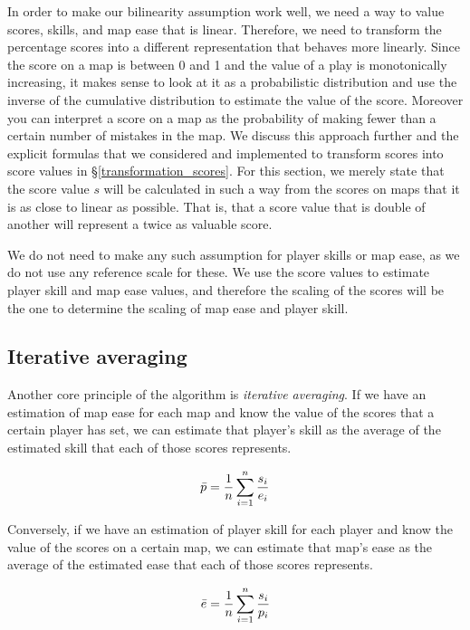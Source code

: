 \documentclass[12pt,a4paper]{article}
\begin{document}
In order to make our bilinearity assumption work well, we need a way to value scores, skills, and map ease that is linear. Therefore, we need to transform the percentage scores into a different representation that behaves more linearly. Since the score on a map is between 0 and 1 and the value of a play is monotonically increasing, it makes sense to look at it as a probabilistic distribution and use the inverse of the cumulative distribution to estimate the value of the score. Moreover you can interpret a score on a map as the probability of making fewer than a certain number of mistakes in the map. We discuss this approach further and the explicit formulas that we considered and implemented to transform scores into score values in \S \ref{transformation_scores}. For this section, we merely state that the score value $s$ will be calculated in such a way from the scores on maps that it is as close to linear as possible. That is, that a score value that is double of another will represent a twice as valuable score.

We do not need to make any such assumption for player skills or map ease, as we do not use any reference scale for these. We use the score values to estimate player skill and map ease values, and therefore the scaling of the scores will be the one to determine the scaling of map ease and player skill.\\

\subsection{Iterative averaging}
\label{iterative_averaging}

Another core principle of the algorithm is {\emph{iterative averaging}}. If we have an estimation of map ease for each map and know the value of the scores that a certain player has set, we can estimate that player's skill as the average of the estimated skill that each of those scores represents.

\begin{equation}
\label{player_skill_averaging}
\bar{p}  = {{1} \over {n}} \sum\limits_{i = 1}^{n} {{s_i} \over {e_i}}
\end{equation}

Conversely, if we have an estimation of player skill for each player and know the value of the scores on a certain map, we can estimate that map's ease as the average of the estimated ease that each of those scores represents.

\begin{equation}
\label{map_ease_averaging}
\bar{e}  = {{1} \over {n}} \sum\limits_{i = 1}^{n} {{s_i} \over {p_i}}
\end{equation}
\end{document}
